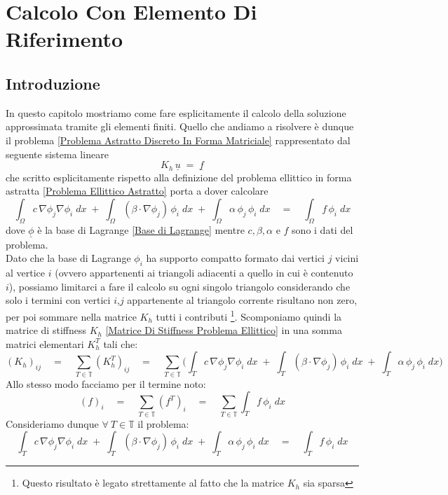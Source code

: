 \documentclass[12pt,a4paper]{report}
\theoremstyle{theorem}
\theoremstyle{theorem}
\theoremstyle{definition}
\begin{document}
\chapter{Calcolo Con Elemento Di Riferimento}

\section{Introduzione}
In questo capitolo mostriamo come fare esplicitamente il calcolo della soluzione approssimata tramite gli elementi finiti. Quello che andiamo a risolvere è dunque il problema \ref{Problema Astratto Discreto In Forma Matriciale} rappresentato dal seguente sistema lineare
\[ K_{h} \, \underline{u} \; = \; \underline{f} \]
che scritto esplicitamente rispetto alla definizione del problema ellittico in forma astratta \ref{Problema Ellittico Astratto} porta a dover calcolare
\[\int_{\Omega}{c \, \nabla \phi_{j} \nabla \phi_{i} \; dx} \; + \; \int_{\Omega}{(\beta \cdot \nabla \phi_{j}) \, \phi_{i} \; dx} \; + \; \int_{\Omega}{\alpha \, \phi_{j} \, \phi_{i} \; dx} \quad = \quad \int_{\Omega}{f \, \phi_{i} \; dx}\]
dove $\underline{\phi}$ è la base di Lagrange \ref{Base di Lagrange} mentre $c, \beta, \alpha$ e $f$ sono i dati del problema.\\
Dato che la base di Lagrange ${\phi}_{i}$ ha supporto compatto formato dai vertici $j$ vicini al vertice $i$ (ovvero appartenenti ai triangoli adiacenti a quello in cui è contenuto $i$), possiamo limitarci a fare il calcolo su ogni singolo triangolo considerando che solo i termini con vertici $i$,$j$ appartenente al triangolo corrente risultano non zero, per poi sommare nella matrice $K_{h}$ tutti i contributi \footnote{Questo risultato è legato strettamente al fatto che la matrice $K_{h}$ sia sparsa}. Scomponiamo quindi la matrice di stiffness $K_{h}$ \ref{Matrice Di Stiffness Problema Ellittico} in una somma matrici elementari $K_{h}^{T}$ tali che:
\[ (K_{h})_{ij} \quad = \quad \sum_{T \in \mathbb{T}}{(K_{h}^T)_{ij}} \quad = \quad \sum_{T \in \mathbb{T}} \bigg(  \int_{T}{c \, \nabla \phi_{j} \nabla \phi_{i} \; dx} \; + \; \int_{T}{(\beta \cdot \nabla \phi_{j}) \, \phi_{i} \; dx} \; + \; \int_{T}{\alpha \, \phi_{j} \, \phi_{i} \; dx} \bigg)\]
Allo stesso modo facciamo per il termine noto:
\[ (f)_{i} \quad = \quad \sum_{T \in \mathbb{T}}{(f^T)_{i}} \quad = \quad \sum_{T \in \mathbb{T}} \int_{T}{f \, \phi_{i} \; dx}\]
Consideriamo dunque $\forall \ T \in \mathbb{T}$ il problema:
\[ \int_{T}{c \, \nabla \phi_{j} \nabla \phi_{i} \; dx} \; + \; \int_{T}{(\beta \cdot \nabla \phi_{j}) \, \phi_{i} \; dx} \; + \; \int_{T}{\alpha \, \phi_{j} \, \phi_{i} \; dx} \quad = \quad \int_{T}{f \, \phi_{i} \; dx}\]
\end{document}
